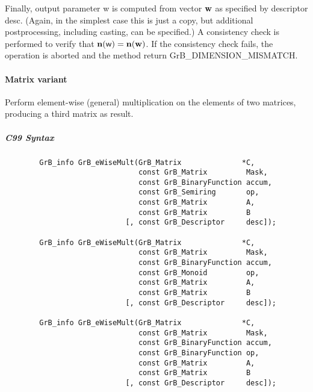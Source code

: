 Finally, output parameter {\sf w} is computed from vector ${\bf w}$
as specified by descriptor {\sf desc}. (Again, in the simplest case this
is just a copy, but additional postprocessing, including casting, can be specified.)  A consistency check is
performed to verify that $\bold{n}({\sf w}) = \bold{n}({\bf w})$. If
the consistency check fails, the operation is aborted and the method
return {\sf GrB\_DIMENSION\_MISMATCH}.


\paragraph{Matrix variant}

Perform element-wise (general) multiplication on the elements of two matrices,
producing a third matrix as result.

\subparagraph{C99 Syntax}

\begin{verbatim}
        GrB_info GrB_eWiseMult(GrB_Matrix              *C,
                               const GrB_Matrix         Mask,
                               const GrB_BinaryFunction accum,
                               const GrB_Semiring       op, 
                               const GrB_Matrix         A,
                               const GrB_Matrix         B
                            [, const GrB_Descriptor     desc]);
                            
        GrB_info GrB_eWiseMult(GrB_Matrix              *C,
                               const GrB_Matrix         Mask,
                               const GrB_BinaryFunction accum,
                               const GrB_Monoid         op, 
                               const GrB_Matrix         A,
                               const GrB_Matrix         B
                            [, const GrB_Descriptor     desc]);
                            
        GrB_info GrB_eWiseMult(GrB_Matrix              *C,
                               const GrB_Matrix         Mask,
                               const GrB_BinaryFunction accum,
                               const GrB_BinaryFunction op, 
                               const GrB_Matrix         A,
                               const GrB_Matrix         B
                            [, const GrB_Descriptor     desc]);
\end{verbatim}

